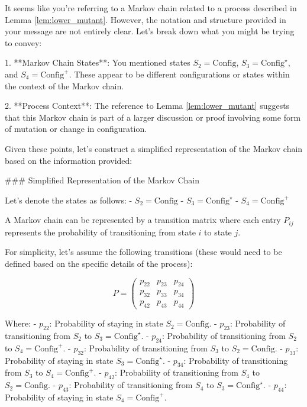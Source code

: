 It seems like you're referring to a Markov chain related to a process described in Lemma \ref{lem:lower_mutant}. However, the notation and structure provided in your message are not entirely clear. Let's break down what you might be trying to convey:

1. **Markov Chain States**: You mentioned states \( S_2 = \text{Config} \), \( S_3 = \text{Config}^\star \), and \( S_4 = \text{Config}^+ \). These appear to be different configurations or states within the context of the Markov chain.

2. **Process Context**: The reference to Lemma \ref{lem:lower_mutant} suggests that this Markov chain is part of a larger discussion or proof involving some form of mutation or change in configuration.

Given these points, let's construct a simplified representation of the Markov chain based on the information provided:

### Simplified Representation of the Markov Chain

Let's denote the states as follows:
- \( S_2 = \text{Config} \)
- \( S_3 = \text{Config}^\star \)
- \( S_4 = \text{Config}^+ \)

A Markov chain can be represented by a transition matrix where each entry \( P_{ij} \) represents the probability of transitioning from state \( i \) to state \( j \).

For simplicity, let's assume the following transitions (these would need to be defined based on the specific details of the process):

\[
P = \begin{pmatrix}
p_{22} & p_{23} & p_{24} \\
p_{32} & p_{33} & p_{34} \\
p_{42} & p_{43} & p_{44}
\end{pmatrix}
\]

Where:
- \( p_{22} \): Probability of staying in state \( S_2 = \text{Config} \).
- \( p_{23} \): Probability of transitioning from \( S_2 \) to \( S_3 = \text{Config}^\star \).
- \( p_{24} \): Probability of transitioning from \( S_2 \) to \( S_4 = \text{Config}^+ \).
- \( p_{32} \): Probability of transitioning from \( S_3 \) to \( S_2 = \text{Config} \).
- \( p_{33} \): Probability of staying in state \( S_3 = \text{Config}^\star \).
- \( p_{34} \): Probability of transitioning from \( S_3 \) to \( S_4 = \text{Config}^+ \).
- \( p_{42} \): Probability of transitioning from \( S_4 \) to \( S_2 = \text{Config} \).
- \( p_{43} \): Probability of transitioning from \( S_4 \) to \( S_3 = \text{Config}^\star \).
- \( p_{44} \): Probability of staying in state \( S_4 = \text{Config}^+ \).

